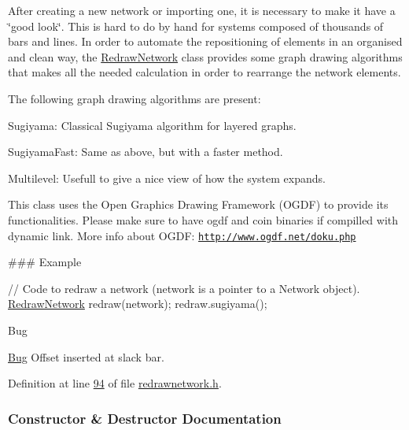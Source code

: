 After creating a new network or importing one, it is necessary to make it have a \char`\"{}good look\char`\"{}. This is hard to do by hand for systems composed of thousands of bars and lines. In order to automate the repositioning of elements in an organised and clean way, the \hyperlink{class_redraw_network}{Redraw\+Network} class provides some graph drawing algorithms that makes all the needed calculation in order to rearrange the network elements.

The following graph drawing algorithms are present\+:
\begin{DoxyItemize}
\item Sugiyama\+: Classical Sugiyama algorithm for layered graphs.
\item Sugiyama\+Fast\+: Same as above, but with a faster method.
\item Multilevel\+: Usefull to give a nice view of how the system expands.
\end{DoxyItemize}

This class uses the Open Graphics Drawing Framework (O\+G\+D\+F) to provide its functionalities. Please make sure to have ogdf and coin binaries if compilled with dynamic link. More info about O\+G\+D\+F\+: \href{http://www.ogdf.net/doku.php}{\tt http\+://www.\+ogdf.\+net/doku.\+php}

\#\#\# Example 
\begin{DoxyCode}
\textcolor{comment}{// Code to redraw a network (network is a pointer to a Network object).}
 \hyperlink{class_redraw_network}{RedrawNetwork} redraw(network);
 redraw.sugiyama();
\end{DoxyCode}


\begin{DoxyRefDesc}{Bug}
\item[\hyperlink{bug__bug000001}{Bug}]Offset inserted at slack bar.\end{DoxyRefDesc}


Definition at line \hyperlink{redrawnetwork_8h_source_l00094}{94} of file \hyperlink{redrawnetwork_8h_source}{redrawnetwork.\+h}.



\subsubsection{Constructor \& Destructor Documentation}
\hypertarget{class_redraw_network_a1fe3edb8c57780eb62f7de8f03dfeda3}{}
